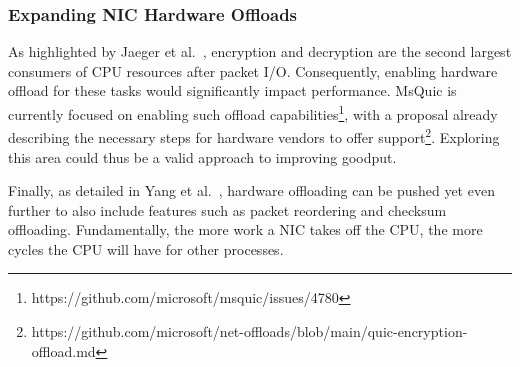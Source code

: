 \subsubsection{Expanding \ac{NIC} Hardware Offloads}
\label{subsubsec:encryption-hw-offload}
As highlighted by Jaeger et al.~\cite{quic_on_the_highway}, encryption and decryption are the second largest consumers of CPU resources after packet I/O. Consequently, enabling hardware offload for these tasks would significantly impact performance. MsQuic is currently focused on enabling such offload capabilities\footnote{https://github.com/microsoft/msquic/issues/4780}, with a proposal already describing the necessary steps for hardware vendors to offer support\footnote{https://github.com/microsoft/net-offloads/blob/main/quic-encryption-offload.md}. Exploring this area could thus be a valid approach to improving goodput.

Finally, as detailed in Yang et al.~\cite{10.1145/3405796.3405827}, hardware offloading can be pushed yet even further to also include features such as packet reordering and checksum offloading. Fundamentally, the more work a \ac{NIC} takes off the CPU, the more cycles the CPU will have for other processes.

